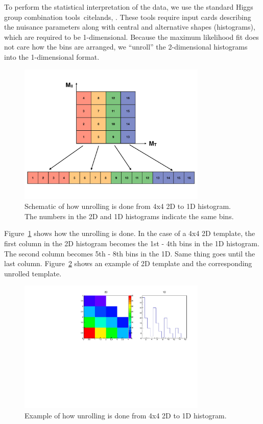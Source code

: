 To perform the statistical interpretation of the data, we use
the standard Higgs group combination tools~cite{lands}, \cite{combine}.
These tools require input cards describing the nuisance parameters
along with central and alternative shapes (histograms), which 
are required to be 1-dimensional.  Because the maximum likelihood
fit does not care how the bins are arranged, we ``unroll'' the 
2-dimensional histograms into the 1-dimensional format.

\begin{figure}[htp]
	\centering
	\includegraphics[width=0.8\textwidth]{figures/unrolling_schematic.pdf}
	\caption{ Schematic of how unrolling is done from 4x4 2D to 1D histogram. 
			  The numbers in the 2D and 1D histograms indicate the same bins.} 
  	\label{fig:unrolling_sch}
\end{figure}

Figure~\ref{fig:unrolling_sch} shows how the unrolling is done.
In the case of a 4x4 2D template, the first column in the 2D histogram 
becomes the 1st - 4th bins in the 1D histogram. The second column becomes 
5th - 8th bins in the 1D. Same thing goes until the last column.  
Figure~\ref{fig:unrolling_ex} shows an example of 2D template and
the corresponding unrolled template.

\begin{figure}[htp]
	\centering
	\includegraphics[width=0.8\textwidth]{figures/unrolling_example.pdf}
	\caption{ Example of how unrolling is done from 4x4 2D to 1D histogram.} 
  	\label{fig:unrolling_ex}
\end{figure}

